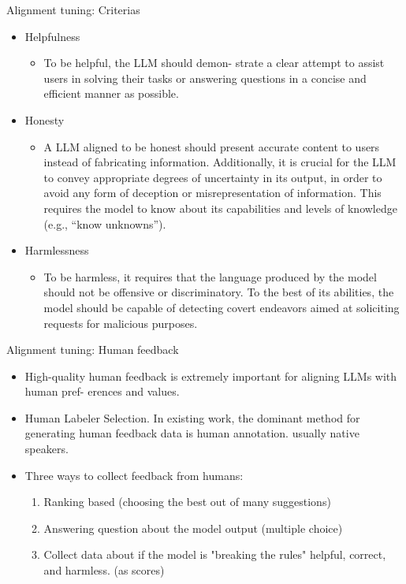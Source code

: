 \documentclass[10pt]{beamer}
\begin{document}
\begin{frame}{Alignment tuning: Criterias}


\begin{itemize}
\item Helpfulness
\begin{itemize}
\item To be helpful, the LLM should demon- strate a clear attempt to assist users in solving their tasks or answering questions in a concise and efficient manner as possible.
\end{itemize}
\item Honesty
\begin{itemize}
\item A LLM aligned to be honest should present accurate content to users instead of fabricating information. Additionally, it is crucial for the LLM to convey appropriate degrees of uncertainty in its output, in order to avoid any form of deception or misrepresentation of information. This requires the model to know about its capabilities and levels of knowledge (e.g., “know unknowns”).
\end{itemize}
\item Harmlessness
\begin{itemize}
\item To be harmless, it requires that the language produced by the model should not be offensive or discriminatory. To the best of its abilities, the model should be capable of detecting covert endeavors aimed at soliciting requests for malicious purposes.
\end{itemize}
\end{itemize}

\end{frame}


\begin{frame}{Alignment tuning: Human feedback}

\begin{itemize}
\item High-quality human feedback is extremely important for aligning LLMs with human pref- erences and values.
\item Human Labeler Selection. In existing work, the dominant method for generating human feedback data is human annotation. usually native speakers.
\item Three ways to collect feedback from humans:
\begin{enumerate}
\item Ranking based (choosing the best out of many suggestions)
\item Answering question about the model output (multiple choice)
\item Collect data about if the model is "breaking the rules" helpful, correct, and harmless. (as scores)
\end{enumerate}
\end{itemize}

\end{frame}
\end{document}
